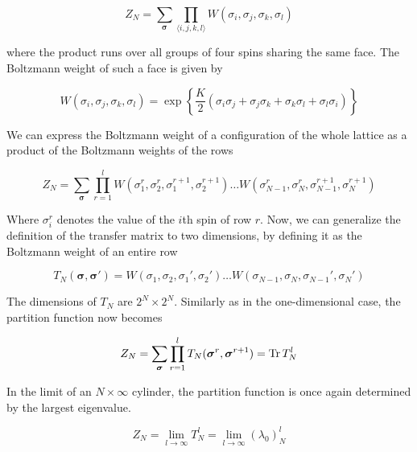\begin{equation}
  Z_N = \sum_{\bm{\sigma}} \prod_{\langle i, j, k, l \rangle} W(\sigma_i, \sigma_j, \sigma_k, \sigma_l)
\end{equation}

where the product runs over all groups of four spins sharing the same face. The Boltzmann weight of such a face is given by

\begin{equation}\label{eq:boltzmann_weight_face_ising_model}
  W(\sigma_i, \sigma_j, \sigma_k, \sigma_l) = \exp \left\{ \frac{K}{2} (\sigma_i \sigma_j + \sigma_j \sigma_k + \sigma_k \sigma_l + \sigma_l \sigma_i) \right\}
\end{equation}

We can express the Boltzmann weight of a configuration of the whole lattice as
a product of the Boltzmann weights of the rows

\begin{equation}
  Z_N = \sum_{\bm{\sigma}} \prod_{r = 1}^{l} W(\sigma_{1}^{r}, \sigma_{2}^{r}, \sigma_{1}^{r+1}, \sigma_{2}^{r+1}) \dots W(\sigma_{N-1}^{r}, \sigma_{N}^{r}, \sigma_{N-1}^{r+1}, \sigma_{N}^{r+1})
\end{equation}

Where $\sigma_{i}^{r}$ denotes the value of the $i$th spin of row $r$. Now, we
can generalize the definition of the transfer matrix to two dimensions, by
defining it as the Boltzmann weight of an entire row

\begin{equation}\label{row_to_row_transfer_matrix}
  T_{N}(\bm{\sigma}, \bm{\sigma'}) = W(\sigma_1, \sigma_2, \sigma_1', \sigma_2') \dots W(\sigma_{N-1}, \sigma_N, \sigma_{N-1}', \sigma_{N}')
\end{equation}

The dimensions of $T_N$ are $2^N \times 2^N$. Similarly as in the
one-dimensional case, the partition function now becomes

\begin{equation}\label{z_n_times_infty}
  Z_N = \sum_{\bm{\sigma}} \prod_{r = 1}^{l} T_{N}(\bm{\sigma}^r, \bm{\sigma}^{r+1}) = \operatorname{Tr} T_{N}^l
\end{equation}

In the limit of an $N \times \infty$ cylinder, the partition function is once again determined by the largest eigenvalue.

\begin{equation}\label{largest_eigenvalue_transfer_matrix}
  Z_N = \lim_{l \to \infty} T_{N}^{l} = \lim_{l \to \infty} (\lambda_0)_{N}^{l}
\end{equation}

